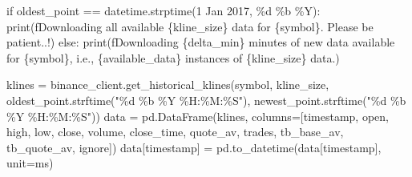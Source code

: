 \documentclass[
  letterpaper,
  DIV=11,
  numbers=noendperiod]{scrartcl}
\newenvironment{Shaded}{\begin{snugshade}}{\end{snugshade}}
\newcommand{\BuiltInTok}[1]{\textcolor[rgb]{0.00,0.23,0.31}{#1}}
\newcommand{\ControlFlowTok}[1]{\textcolor[rgb]{0.00,0.23,0.31}{#1}}
\newcommand{\NormalTok}[1]{\textcolor[rgb]{0.00,0.23,0.31}{#1}}
\newcommand{\OperatorTok}[1]{\textcolor[rgb]{0.37,0.37,0.37}{#1}}
\newcommand{\SpecialCharTok}[1]{\textcolor[rgb]{0.37,0.37,0.37}{#1}}
\newcommand{\SpecialStringTok}[1]{\textcolor[rgb]{0.13,0.47,0.30}{#1}}
\newcommand{\StringTok}[1]{\textcolor[rgb]{0.13,0.47,0.30}{#1}}
\begin{document}
\begin{Shaded}
\begin{Highlighting}[]
    \ControlFlowTok{if}\NormalTok{ oldest\_point }\OperatorTok{==}\NormalTok{ datetime.strptime(}\StringTok{\textquotesingle{}1 Jan 2017\textquotesingle{}}\NormalTok{, }\StringTok{\textquotesingle{}}\SpecialCharTok{\%d}\StringTok{ \%b \%Y\textquotesingle{}}\NormalTok{):}
        \BuiltInTok{print}\NormalTok{(}\SpecialStringTok{f\textquotesingle{}Downloading all available }\SpecialCharTok{\{}\NormalTok{kline\_size}\SpecialCharTok{\}}\SpecialStringTok{ data for }\SpecialCharTok{\{}\NormalTok{symbol}\SpecialCharTok{\}}\SpecialStringTok{. Please be patient..!\textquotesingle{}}\NormalTok{)}
    \ControlFlowTok{else}\NormalTok{:}
        \BuiltInTok{print}\NormalTok{(}\SpecialStringTok{f\textquotesingle{}Downloading }\SpecialCharTok{\{}\NormalTok{delta\_min}\SpecialCharTok{\}}\SpecialStringTok{ minutes of new data available for }\SpecialCharTok{\{}\NormalTok{symbol}\SpecialCharTok{\}}\SpecialStringTok{, i.e., }\SpecialCharTok{\{}\NormalTok{available\_data}\SpecialCharTok{\}}\SpecialStringTok{ instances of }\SpecialCharTok{\{}\NormalTok{kline\_size}\SpecialCharTok{\}}\SpecialStringTok{ data.\textquotesingle{}}\NormalTok{)}

\NormalTok{    klines }\OperatorTok{=}\NormalTok{ binance\_client.get\_historical\_klines(symbol, kline\_size, oldest\_point.strftime(}\StringTok{"}\SpecialCharTok{\%d}\StringTok{ \%b \%Y \%H:\%M:\%S"}\NormalTok{), newest\_point.strftime(}\StringTok{"}\SpecialCharTok{\%d}\StringTok{ \%b \%Y \%H:\%M:\%S"}\NormalTok{))}
\NormalTok{    data }\OperatorTok{=}\NormalTok{ pd.DataFrame(klines, columns}\OperatorTok{=}\NormalTok{[}\StringTok{\textquotesingle{}timestamp\textquotesingle{}}\NormalTok{, }\StringTok{\textquotesingle{}open\textquotesingle{}}\NormalTok{, }\StringTok{\textquotesingle{}high\textquotesingle{}}\NormalTok{, }\StringTok{\textquotesingle{}low\textquotesingle{}}\NormalTok{, }\StringTok{\textquotesingle{}close\textquotesingle{}}\NormalTok{, }\StringTok{\textquotesingle{}volume\textquotesingle{}}\NormalTok{, }\StringTok{\textquotesingle{}close\_time\textquotesingle{}}\NormalTok{, }\StringTok{\textquotesingle{}quote\_av\textquotesingle{}}\NormalTok{, }\StringTok{\textquotesingle{}trades\textquotesingle{}}\NormalTok{, }\StringTok{\textquotesingle{}tb\_base\_av\textquotesingle{}}\NormalTok{, }\StringTok{\textquotesingle{}tb\_quote\_av\textquotesingle{}}\NormalTok{, }\StringTok{\textquotesingle{}ignore\textquotesingle{}}\NormalTok{])}
\NormalTok{    data[}\StringTok{\textquotesingle{}timestamp\textquotesingle{}}\NormalTok{] }\OperatorTok{=}\NormalTok{ pd.to\_datetime(data[}\StringTok{\textquotesingle{}timestamp\textquotesingle{}}\NormalTok{], unit}\OperatorTok{=}\StringTok{\textquotesingle{}ms\textquotesingle{}}\NormalTok{)}
    

\end{Highlighting}
\end{Shaded}
\end{document}
